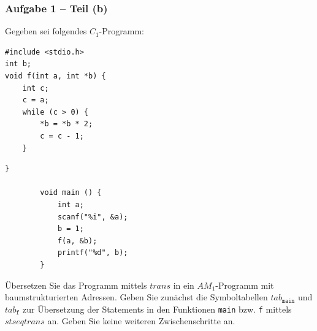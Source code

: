 \documentclass{beamer}
\begin{document}
\begin{frame}[fragile] \frametitle{Aufgabe 1 -- Teil (b)}
	\small
	Gegeben sei folgendes $C_1$-Programm:
	\begin{minipage}{\dimexpr0.5\linewidth-\fboxrule-\fboxsep}
		\begin{lstlisting}
#include <stdio.h>
int b;
void f(int a, int *b) {
	int c;
	c = a;
	while (c > 0) {
		*b = *b * 2;
		c = c - 1;
	}
		\end{lstlisting}	
	\end{minipage}
	\begin{minipage}{\dimexpr0.5\linewidth-\fboxrule-\fboxsep}
	\begin{lstlisting}[firstnumber=10]
		}
		
		void main () {
			int a;
			scanf("%i", &a);
			b = 1;
			f(a, &b);
			printf("%d", b);
		}
	\end{lstlisting}	
\end{minipage}

Übersetzen Sie das Programm mittels $trans$ in ein $AM_1$-Programm mit baumstrukturierten Adressen. Geben Sie zunächst die Symboltabellen $tab_{\texttt{main}}$ und $tab_{\texttt{f}}$ zur Übersetzung der Statements in den Funktionen \texttt{main} bzw. \texttt{f} mittels $stseqtrans$ an. Geben Sie keine weiteren Zwischenschritte an.
\end{frame}
\end{document}
